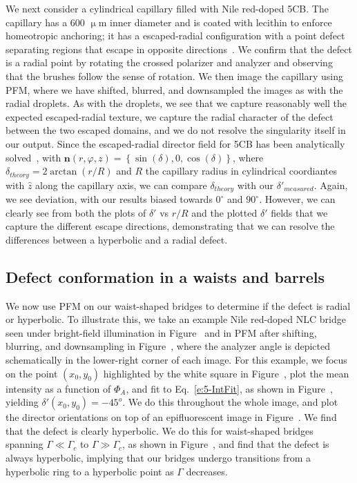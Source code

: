 We next consider a cylindrical capillary filled with Nile red-doped 5CB.\@
The capillary has a 600 $\upmu$m inner diameter and is coated with lecithin to enforce homeotropic anchoring; it has a escaped-radial configuration with a point defect separating regions that escape in opposite directions~\cite{RN179}.
We confirm that the defect is a radial point by rotating the crossed polarizer and analyzer and observing that the brushes follow the sense of rotation.
We then image the capillary using PFM, where we have shifted, blurred, and downsampled the images as with the radial droplets.
As with the droplets, we see that we capture reasonably well the expected escaped-radial texture, we capture the radial character of the defect between the two escaped domains, and we do not resolve the singularity itself in our output.
Since the escaped-radial director field for 5CB has been analytically solved~, with $\mathbf{n}(r,\varphi,z) = \left \{ \sin(\delta), 0, \cos(\delta)   \right \}$, where $\delta_{theory} = 2 \arctan(r/R) $ and $R$ the capillary radius in cylindrical coordiantes with $\hat{z}$ along the capillary axis, we can compare  $\delta_{theory}$ with our $\delta'_{measured}$.
Again, we see deviation, with our results biased towards $0^{\circ}$ and $90^{\circ}$.
However, we can clearly see from both the plots of $\delta'$ vs $r/R$ and the plotted $\delta'$ fields that we capture the different escape directions, demonstrating that we can resolve the differences between a hyperbolic and a radial defect.


\subsection{Defect conformation in a waists and barrels}
We now use PFM on our waist-shaped bridges to determine if the defect is radial or hyperbolic.
To illustrate this, we take an example Nile red-doped NLC bridge seen under bright-field illumination in Figure~ and in PFM after shifting, blurring, and downsampling in Figure~, where the analyzer angle is depicted schematically in the lower-right corner of each image.
For this example, we focus on the point $(x_0,y_0)$ highlighted by the white square in Figure~, plot the mean intensity as a function of $\Phi_A$, and fit to Eq.~\ref{e:5-IntFit}, as shown in Figure~, yielding $\delta'(x_0,y_0) = -45^o$.
We do this throughout the whole image, and plot the director orientations on top of an epifluorescent image in Figure~.
We find that the defect is clearly hyperbolic.
We do this for waist-shaped bridges spanning $\Gamma \ll \Gamma_c$ to $\Gamma \gg \Gamma_c$, as shown in Figure~, and find that the defect is always hyperbolic, implying that our bridges undergo transitions from a hyperbolic ring to a hyperbolic point as $\Gamma$ decreases.

